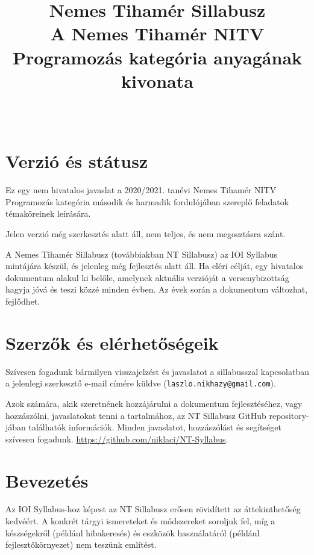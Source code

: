 \documentclass[a4paper,11pt,oneside]{article}
\begin{document}
\title{\sf Nemes Tihamér Sillabusz \\
    \large A Nemes Tihamér NITV Programozás kategória anyagának kivonata}
\author{}
\date{~}
\maketitle

\section{Verzió és státusz}%

Ez egy nem hivatalos javaslat a 2020/2021. tanévi Nemes Tihamér NITV Programozás kategória
második és harmadik fordulójában szereplő feladatok témaköreinek leírására.

\medskip

Jelen verzió még szerkesztés alatt áll, nem teljes, és nem megosztásra szánt.

\medskip

A Nemes Tihamér Sillabusz (továbbiakban NT Sillabusz) az IOI Syllabus mintájára készül,
és jelenleg még fejlesztés alatt áll. Ha eléri célját, egy hivatalos dokumentum alakul ki belőle,
amelynek aktuális verzióját a versenybizottság hagyja jóvá és teszi közzé minden évben.
Az évek során a dokumentum változhat, fejlődhet.


\section{Szerzők és elérhetőségeik}%

Szívesen fogadunk bármilyen visszajelzést és javaslatot a sillabusszal kapcsolatban
a jelenlegi szerkesztő e-mail címére küldve (\verb!laszlo.nikhazy@gmail.com!).

Azok számára, akik szeretnének hozzájárulni a dokumentum fejlesztéséhez, vagy hozzászólni,
javaslatokat tenni a tartalmához, az NT Sillabusz GitHub repository-jában találhatók információk.
Minden javaslatot, hozzászólást és segítséget szívesen fogadunk.
\url{https://github.com/niklaci/NT-Syllabus}.

\section{Bevezetés}\label{sec:intro}%

Az IOI Syllabus-hoz képest az NT Sillabusz erősen rövidített az áttekinthetőség kedvéért.
A konkrét tárgyi ismereteket és módszereket soroljuk fel, míg a készségekről (például hibakeresés)
és eszközök használatáról (például fejlesztőkörnyezet) nem teszünk említést.
\end{document}
